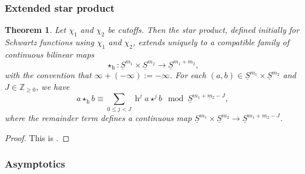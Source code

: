 \documentclass[reqno]{amsart}
\DeclareMathOperator{\h}{h}
\theoremstyle{plain} \newtheorem{theorem} {Theorem}
\theoremstyle{definition} \newtheorem{definition} [theorem] {Definition}
\theoremstyle{itplain} %
\numberwithin{equation}{section}
\numberwithin{theorem}{section}
\renewcommand{\geq}{\geqslant}
\renewcommand{\leq}{\leqslant}
\begin{document}
\subsubsection{Extended star product}

\begin{theorem}\label{thm:extended-star-product}
  Let $\chi_1$ and $\chi_2$ be cutoffs.  Then the star product, defined initially for Schwartz functions using $\chi_1$ and $\chi_2$, extends uniquely to a compatible family of continuous bilinear maps
  \begin{equation*}
    \star_{\h} : \underline{S}^{m_1} \times \underline{S}^{m_2} \rightarrow \underline{S}^{m_1 + m_2},
  \end{equation*}
  with the convention that $\infty + (-\infty) := -\infty$.  For each $(a,b) \in \underline{S}^{m_1} \times \underline{S}^{m_2}$ and $J \in \mathbb{Z}_{\geq 0}$, we have
  \begin{equation*}
    a \star_{\h} b \equiv \sum _{0 \leq j < J} \h^j a \star ^j b \mod{ \underline{S} ^{m _1 + m _2 - J} },
  \end{equation*}
  where the remainder term defines a continuous map $\underline{S} ^{m _1 } \times \underline{S} ^{m _2 } \rightarrow \underline{S} ^{m _1 + m _2 - J}$.
\end{theorem}
\begin{proof}
  This is \cite[Thm 1]{nelson-venkatesh-1}.
\end{proof}


\subsubsection{Asymptotics}\label{sec:star-prod-asymptotics}
\end{document}
